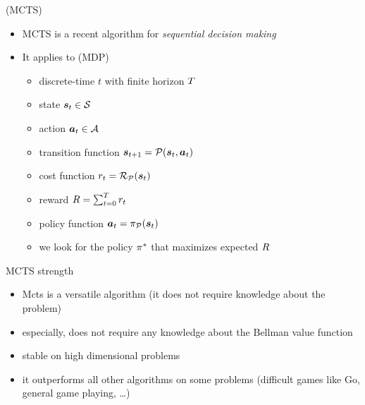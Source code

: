 \begin{frame}{\mcts{} (MCTS)}
    \begin{itemize}
        \item MCTS is a recent algorithm for {\em sequential decision making}
        \item It applies to \mdp{} (MDP)
        \begin{itemize}
            \item discrete-time $t$ with finite horizon $T$
            \item state $\boldsymbol{s}_t \in \mathcal{S}$
            \item action $\boldsymbol{a}_t \in \mathcal{A}$
            \item transition function $\boldsymbol{s}_{t+1} = \mathcal{P}(\boldsymbol{s}_t, \boldsymbol{a}_t)$
            \item cost function $r_t = \mathcal{R}_{\mathcal{P}}(\boldsymbol{s}_t)$
            \item reward $R = \sum_{t = 0}^{T}{r_t}$
            \item policy function $\boldsymbol{a}_t = \pi_{\mathcal{P}}(\boldsymbol{s}_t)$
            \item we look for the policy $\pi^*$ that maximizes expected $R$ 
        \end{itemize}
    \end{itemize}
\end{frame}


\begin{frame}{MCTS strength}
    \begin{itemize}
        \item Mcts is a versatile algorithm (it does not require knowledge about the problem)
        \item especially, does not require any knowledge about the Bellman value function
        \item stable on high dimensional problems
        \item it outperforms all other algorithms on some problems (difficult games like Go, general game playing, \dots)
    \end{itemize}
\end{frame}


